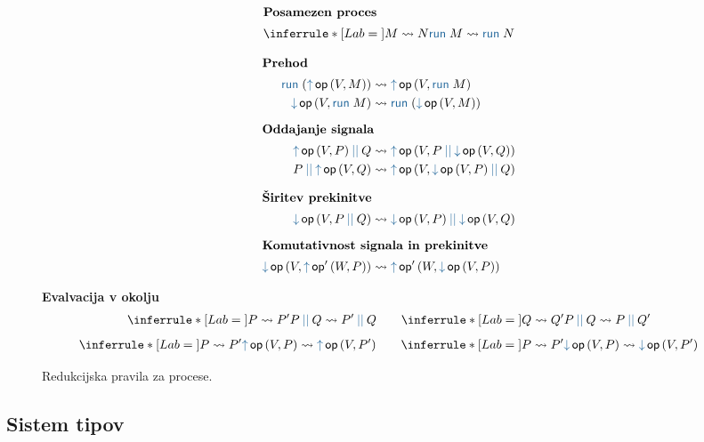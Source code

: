 \begin{figure}[H]
    \centering
	\small
	\begin{minipage}[t]{0.4\textwidth}
		\centering
		\begin{align*}
		\intertext{\textbf{Posamezen proces}}
		\coopinfer{}{
			M \reduces N
		}{
			\tmrun M \reduces \tmrun N
		}
		\end{align*}
	\end{minipage}
	\qquad
	\begin{align*}
	\intertext{\textbf{Prehod}}
	\tmrun {(\tmopout{op}{V}{M})}  &\reduces \tmopout{op}{V}{\tmrun M}
	\\
	\tmopin{op}{V}{\tmrun M} &\reduces \tmrun {(\tmopin{op}{V}{M})}
	\\[1ex]
	\intertext{\textbf{Oddajanje signala}}
	\tmpar{\tmopout{op}{V}{P}}{Q} &\reduces \tmopout{op}{V}{\tmpar{P}{\tmopin{op}{V}{Q}}}
	\\
	\tmpar{P}{\tmopout{op}{V}{Q}} &\reduces \tmopout{op}{V}{\tmpar{\tmopin{op}{V}{P}}{Q}}
	\\[1ex]
	\intertext{\textbf{Širitev prekinitve}}
	\tmopin{op}{V}{\tmpar P Q} &\reduces \tmpar {\tmopin{op}{V}{P}} {\tmopin{op}{V}{Q}}
	\\[1ex]
	\intertext{\textbf{Komutativnost signala in prekinitve}}
	\tmopin{op}{V}{\tmopout{op'}{W}{P}} &\reduces \tmopout{op'}{W}{\tmopin{op}{V}{P}}
	\end{align*}
	
	\textbf{Evalvacija v okolju}
	\begin{align*}
	\coopinfer{}{
		P \reduces P'
	}{
		\tmpar{P}{Q}  \reduces \tmpar{P'}{Q}
	}
	\qquad
	\coopinfer{}{
		Q \reduces Q'
	}{
		\tmpar{P}{Q}  \reduces \tmpar{P}{Q'}
	}
	\end{align*}
\vspace{-4ex}
	\begin{align*}
		\coopinfer{}{
			P \reduces P'
		}{
			\tmopout{op}{V}{P}  \reduces \tmopout{op}{V}{P'}
		}
		\qquad
		\coopinfer{}{
			P \reduces P'
		}{
			\tmopin{op}{V}{P}  \reduces \tmopin{op}{V}{P'}
		}
	\end{align*}
	
	\caption{Redukcijska pravila za procese.}
	\label{fig:small-step-semantics-of-processes}
\end{figure}



\subsection{Sistem tipov}

